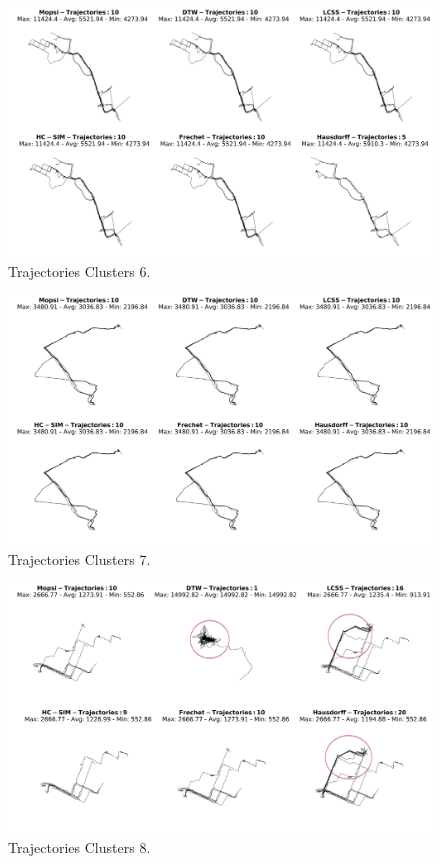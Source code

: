 \documentclass[a4paper, 12pt]{article}
\begin{document}
\begin{figure}[htbp!]
    \centering
    \includegraphics[width=1\textwidth]{Mopsi Clusters 6.png}
    \caption{Trajectories Clusters 6.}
    \label{fig32}
\end{figure}

\begin{figure}[htbp!]
    \centering
    \includegraphics[width=1\textwidth]{Mopsi Clusters 7.png}
    \caption{Trajectories Clusters 7.}
    \label{fig33}
\end{figure}

\begin{figure}[htbp!]
    \centering
    \includegraphics[width=1\textwidth]{Mopsi Clusters 8.png}
    \caption{Trajectories Clusters 8.}
    \label{fig34}
\end{figure}
\end{document}
